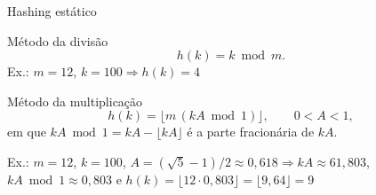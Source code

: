 \documentclass[aspectratio=169,10pt]{beamer}
\begin{document}
\begin{frame}{Hashing estático}
  \begin{block}{Método da divisão}
    \[ h(k) = k \bmod m . \]
    Ex.: $m=12$, $k=100 \Rightarrow h(k)=4$
  \end{block}
  \begin{block}{Método da multiplicação}
    \[ h(k) = \lfloor m\,(kA \bmod 1) \rfloor, \qquad 0<A<1, \]
    em que $kA \bmod 1 = kA - \lfloor kA\rfloor$ é a parte fracionária de $kA$.

    Ex.: $m=12$, $k=100$, $A=(\sqrt{5}-1)/2\approx 0{,}618 \Rightarrow kA\approx 61{,}803$,
    $kA \bmod 1\approx 0{,}803$ e $h(k)=\lfloor 12\cdot 0{,}803\rfloor=\lfloor 9{,}64\rfloor=9$
  \end{block}
\end{frame}
\end{document}

